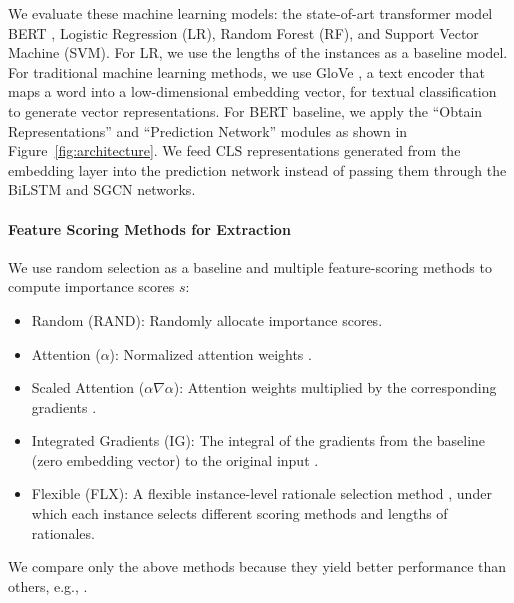 \documentclass[letterpaper]{article} %
\newcommand{\fqt}[1]{``#1''}
\newcommand{\be}{\begin{itemize}}
\newcommand{\ee}{\end{itemize}}
\begin{document}
We evaluate these machine learning models: the state-of-art transformer model BERT \cite{Devlin-2019-BERT}, Logistic Regression (LR), Random Forest (RF), and Support Vector Machine (SVM).
For LR, we use the lengths of the instances as a baseline model.
For traditional machine learning methods, we use GloVe \cite{pennington-2014-glove}, a text encoder that maps a word into a low-dimensional embedding vector, for textual classification to generate vector representations.
For BERT baseline, we apply the \fqt{Obtain Representations} and \fqt{Prediction Network} modules as shown in Figure~\ref{fig:architecture}.
We feed $\textrm{CLS}$ representations generated from the embedding layer into the prediction network instead of passing them through the BiLSTM and SGCN networks.

\paragraph{Feature Scoring Methods for Extraction}
We use random selection as a baseline and multiple feature-scoring methods to compute importance scores $s$:
\be{}
    \item Random (RAND): Randomly allocate importance scores.
    \item Attention ($\alpha$): Normalized attention weights \cite{jain-2020-learning}.
    \item Scaled Attention ($\alpha\nabla\alpha$): Attention weights multiplied by the corresponding gradients \cite{serrano-2019-attention}.
    \item Integrated Gradients (IG): The integral of the gradients from the baseline (zero embedding vector) to the original input \cite{sundararajan-2017-axiomatic}.
    \item Flexible (FLX): A flexible instance-level rationale selection method \cite{chrysostomou-2022-flexible}, under which each instance selects different scoring methods and lengths of rationales.
\ee{}
We compare only the above methods because they yield better performance than others, e.g., \cite{atanasova-2020-diagnostic}.
\end{document}
